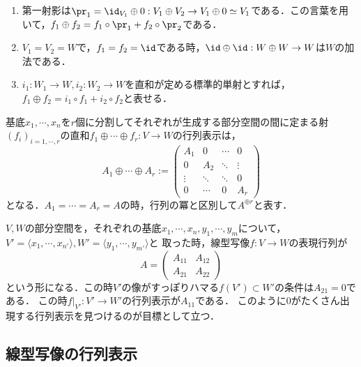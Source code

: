 \documentclass[uplatex, dvipdfmx]{jsreport}
\begin{document}
\begin{example}\mbox{}
    \begin{enumerate}
        \item 第一射影は$\pr_1=\id_{V_1}\oplus 0:V_1\oplus V_2\to V_1\oplus 0\simeq V_1$である．この言葉を用いて，$f_1\oplus f_2=f_1\circ\pr_1+f_2\circ\pr_2$である．
        \item $V_1=V_2=W$で，$f_1=f_2=\id$である時，$\id\oplus\id:W\oplus W\to W$は$W$の加法である．
        \item $i_1:W_1\to W,i_2:W_2\to W$を直和が定める標準的単射とすれば，$f_1\oplus f_2=i_1\circ f_1+i_2\circ f_2$と表せる．
    \end{enumerate}
\end{example}

\begin{definition}[行列の直和]
    基底$x_1,\cdots,x_n$を$r$個に分割してそれぞれが生成する部分空間の間に定まる射$(f_i)_{i=1,\cdots,r}$の直和$f_1\oplus\cdots\oplus f_r:V\to W$の行列表示は，
    \[ A_1\oplus\cdots\oplus A_r:=\begin{pmatrix}A_1&0&\cdots&0\\0&A_2&\ddots&\vdots\\\vdots&\ddots&\ddots&0\\0&\cdots&0&A_r\end{pmatrix} \]
    となる．$A_1=\cdots=A_r=A$の時，行列の冪と区別して$A^{\oplus r}$と表す．
\end{definition}

\begin{example}[部分空間と行列表示]
    $V,W$の部分空間を，それぞれの基底$x_1,\cdots,x_n,y_1,\cdots,y_m$について，$V'=\langle x_1,\cdots,x_{n'}\rangle,W'=\langle y_1,\cdots,y_{m'}\rangle$と
    取った時，線型写像$f:V\to W$の表現行列が
    \[ A=\begin{pmatrix}A_{11}&A_{12}\\A_{21}&A_{22}\end{pmatrix} \]
    という形になる．この時$V'$の像がすっぽりハマる$f(V')\subset W'$の条件は$A_{21}=0$である．
    この時$f|_{V'}:V'\to W'$の行列表示が$A_{11}$である．
    このように$0$がたくさん出現する行列表示を見つけるのが目標として立つ．
\end{example}

\subsection{線型写像の行列表示}
\end{document}
